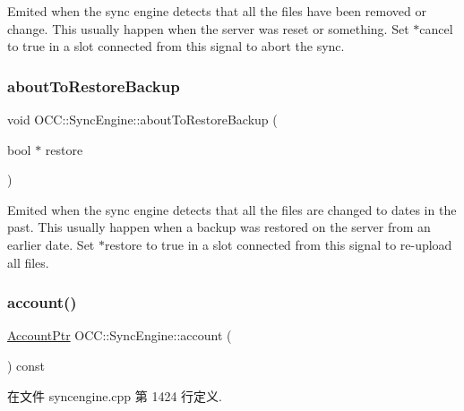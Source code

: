 Emited when the sync engine detects that all the files have been removed or change. This usually happen when the server was reset or something. Set $\ast$cancel to true in a slot connected from this signal to abort the sync. \mbox{\label{class_o_c_c_1_1_sync_engine_abcf3c65f0aa430771b8b5dfb8750c03a}} 
\subsubsection{\texorpdfstring{about\+To\+Restore\+Backup}{aboutToRestoreBackup}}
{\footnotesize\ttfamily void O\+C\+C\+::\+Sync\+Engine\+::about\+To\+Restore\+Backup (\begin{DoxyParamCaption}\item[{bool $\ast$}]{restore }\end{DoxyParamCaption})\hspace{0.3cm}{\ttfamily [signal]}}

Emited when the sync engine detects that all the files are changed to dates in the past. This usually happen when a backup was restored on the server from an earlier date. Set $\ast$restore to true in a slot connected from this signal to re-\/upload all files. \mbox{\label{class_o_c_c_1_1_sync_engine_acf2809ef8a773ce4b3c16faf4f4a250e}} 
\subsubsection{\texorpdfstring{account()}{account()}}
{\footnotesize\ttfamily \hyperlink{namespace_o_c_c_a848616aedb9188e223c6b9867757fe69}{Account\+Ptr} O\+C\+C\+::\+Sync\+Engine\+::account (\begin{DoxyParamCaption}{ }\end{DoxyParamCaption}) const}



在文件 syncengine.\+cpp 第 1424 行定义.

\mbox{\label{class_o_c_c_1_1_sync_engine_ae46ce9f703858001be51d217819108e3}} 
